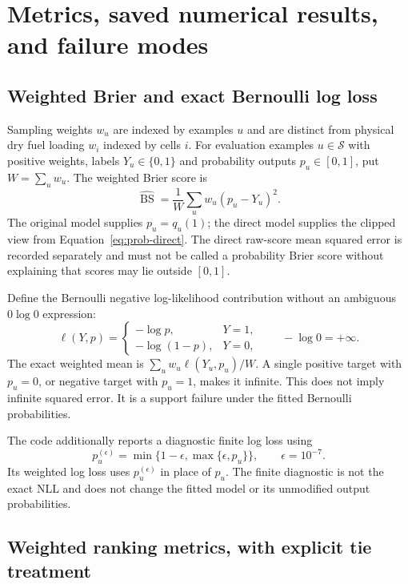 \documentclass[11pt,a4paper]{article}
\begin{document}
\section{Metrics, saved numerical results, and failure modes}
\label{sec:probability-metrics}

\subsection{Weighted Brier and exact Bernoulli log loss}

Sampling weights $w_u$ are indexed by examples $u$ and are distinct from
physical dry fuel loading $w_i$ indexed by cells $i$.
For evaluation examples $u\in\mathcal S$ with positive weights, labels
$Y_u\in\{0,1\}$ and probability outputs $p_u\in[0,1]$, put
$W=\sum_uw_u$. The weighted Brier score is
\begin{equation}
 \widehat{\operatorname{BS}}=\frac{1}{W}\sum_uw_u(p_u-Y_u)^2.
\end{equation}
The original model supplies $p_u=q_u(1)$; the direct model supplies the clipped
view from Equation~\eqref{eq:prob-direct}. The direct raw-score mean squared
error is recorded separately and must not be called a probability Brier score
without explaining that scores may lie outside $[0,1]$.

Define the Bernoulli negative log-likelihood contribution without an ambiguous
$0\log0$ expression:
\begin{equation}
 \ell(Y,p)=\begin{cases}-\log p,&Y=1,\\-\log(1-p),&Y=0,\end{cases}
 \qquad -\log0=+\infty.
\end{equation}
The exact weighted mean is $\sum_uw_u\ell(Y_u,p_u)/W$. A single positive
target with $p_u=0$, or negative target with $p_u=1$, makes it infinite.
This does not imply infinite squared error. It is a support failure under
the fitted Bernoulli probabilities.

The code additionally reports a diagnostic finite log loss using
\begin{equation}
 p_u^{(\epsilon)}=\min\{1-\epsilon,\max\{\epsilon,p_u\}\},
 \qquad \epsilon=10^{-7}.
\end{equation}
Its weighted log loss uses $p_u^{(\epsilon)}$ in place of $p_u$. The finite
diagnostic is not the exact NLL and does not change the fitted model or its
unmodified output probabilities.

\subsection{Weighted ranking metrics, with explicit tie treatment}
\end{document}
